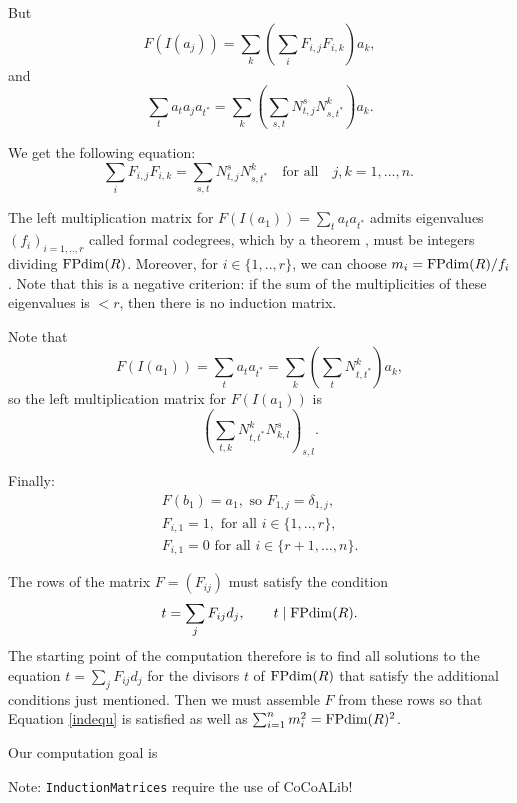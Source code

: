 But
\[ F(I(a_j)) = \sum_k \left( \sum_i F_{i,j} F_{i,k} \right) a_k, \]
and
\[ \sum_t a_t a_j a_{t^*} = \sum_k \left( \sum_{s,t} N_{t,j}^s N_{s,t^*}^k \right) a_k. \]

We get the following equation:
\begin{equation}
\sum_i F_{i,j} F_{i,k} = \sum_{s,t} N_{t,j}^s N_{s,t^*}^k\quad\text{for all}\quad j,k = 1,\dots,n. \ \label{indequ}
\end{equation}


The left multiplication matrix for $F(I(a_1)) = \sum_t a_t a_{t^*}$ admits eigenvalues $(f_i)_{i=1,..,r}$ called formal codegrees, which by a theorem \cite[Cor. 2.14]{Ost}, must be integers dividing $\operatorname{FPdim}(R)$. Moreover, for $i \in \{1,..,r\}$, we can choose $m_i = \operatorname{FPdim}(R)/f_i$. Note that this is a negative criterion: if the sum of the multiplicities of these eigenvalues is $< r$, then there is no induction matrix.

Note that
\[ F(I(a_1)) = \sum_t a_t a_{t^*} = \sum_k \left( \sum_t N_{t,t^*}^k \right) a_k, \]
so the left multiplication matrix for $F(I(a_1))$ is
\[ \left( \sum_{t,k} N_{t,t^*}^k N_{k,l}^s \right) _{s,l}. \]

Finally:
\begin{gather*}
 F(b_1) = a_1, \text{ so } F_{1,j} = \delta_{1,j}, \\
 F_{i,1} = 1, \text{ for all } i \in \{1,..,r\}, \\
 F_{i,1} = 0 \text{ for all } i \in \{r+1,\ldots,n\}.
\end{gather*} 

The rows of the matrix $F = (F_{ij})$ must satisfy the condition
$$
t = \sum_{j} F_{ij} d_j, \qquad t\mid \operatorname{FPdim}(R).
$$
The starting point of the computation therefore is to find all solutions to the equation $t = \sum_{j} F_{ij} d_j$ for the divisors $t$ of $\operatorname{FPdim}(R)$ that satisfy the additional conditions just mentioned. Then we must assemble $F$ from these rows so that Equation \eqref{indequ} is satisfied as well as $\sum_{i=1}^n m_i^2 = \operatorname{FPdim}(R)^2$. 

Our computation goal is
\begin{itemize}
\itemtt[InductionMatrices]
\end{itemize}
Note: \verb*|InductionMatrices| require the use of CoCoALib!

